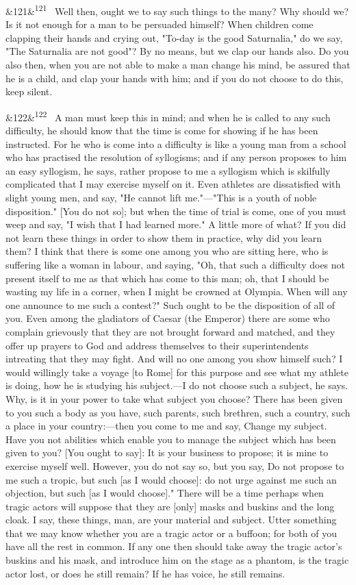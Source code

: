 \documentclass[12pt]{article}
\newcommand{\para}[1][]{\par\noindent\ifx&#1&\else\textsuperscript{\footnotesize #1}~\fi}
\begin{document}
\para[121] Well then, ought we to say such things to the many? Why should we? Is it not enough for a man to be persuaded himself? When children come clapping their hands and crying out, "To-day is the good Saturnalia," do we say, "The Saturnalia are not good"? By no means, but we clap our hands also. Do you also then, when you are not able to make a man change his mind, be assured that he is a child, and clap your hands with him; and if you do not choose to do this, keep silent.

\para[122] A man must keep this in mind; and when he is called to any such difficulty, he should know that the time is come for showing if he has been instructed. For he who is come into a difficulty is like a young man from a school who has practised the resolution of syllogisms; and if any person proposes to him an easy syllogism, he says, rather propose to me a syllogism which is skilfully complicated that I may exercise myself on it. Even athletes are dissatisfied with slight young men, and say, "He cannot lift me."—"This is a youth of noble disposition." [You do not so]; but when the time of trial is come, one of you must weep and say, "I wish that I had learned more." A little more of what? If you did not learn these things in order to show them in practice, why did you learn them? I think that there is some one among you who are sitting here, who is suffering like a woman in labour, and saying, "Oh, that such a difficulty does not present itself to me as that which has come to this man; oh, that I should be wasting my life in a corner, when I might be crowned at Olympia. When will any one announce to me such a contest?" Such ought to be the disposition of all of you. Even among the gladiators of Caesar (the Emperor) there are some who complain grievously that they are not brought forward and matched, and they offer up prayers to God and address themselves to their superintendents intreating that they may fight. And will no one among you show himself such? I would willingly take a voyage [to Rome] for this purpose and see what my athlete is doing, how he is studying his subject.—I do not choose such a subject, he says. Why, is it in your power to take what subject you choose? There has been given to you such a body as you have, such parents, such brethren, such a country, such a place in your country:—then you come to me and say, Change my subject. Have you not abilities which enable you to manage the subject which has been given to you? [You ought to say]: It is your business to propose; it is mine to exercise myself well. However, you do not say so, but you say, Do not propose to me such a tropic, but such [as I would choose]: do not urge against me such an objection, but such [as I would choose]." There will be a time perhaps when tragic actors will suppose that they are [only] masks and buskins and the long cloak. I say, these things, man, are your material and subject. Utter something that we may know whether you are a tragic actor or a buffoon; for both of you have all the rest in common. If any one then should take away the tragic actor's buskins and his mask, and introduce him on the stage as a phantom, is the tragic actor lost, or does he still remain? If he has voice, he still remains.
\end{document}
